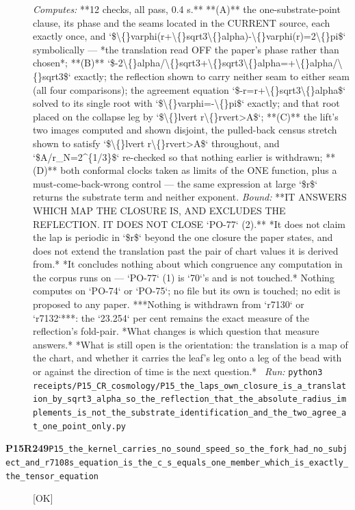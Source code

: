 \begin{description}
\emph{Computes:} **12 checks, all pass, 0.4 s.** **(A)** the one-substrate-point clause, its phase and the seams located in the CURRENT source, each exactly once, and `\$\textbackslash\{\}varphi(r+\textbackslash\{\}sqrt3\textbackslash\{\}alpha)-\textbackslash\{\}varphi(r)=2\textbackslash\{\}pi\$` symbolically --- *the translation read OFF the paper's phase rather than chosen*; **(B)** `\$-2\textbackslash\{\}alpha/\textbackslash\{\}sqrt3+\textbackslash\{\}sqrt3\textbackslash\{\}alpha=+\textbackslash\{\}alpha/\textbackslash\{\}sqrt3\$` exactly; the reflection shown to carry neither seam to either seam (all four comparisons); the agreement equation `\$-r=r+\textbackslash\{\}sqrt3\textbackslash\{\}alpha\$` solved to its single root with `\$\textbackslash\{\}varphi=-\textbackslash\{\}pi\$` exactly; and that root placed on the collapse leg by `\$\textbackslash\{\}lvert r\textbackslash\{\}rvert>A\$`; **(C)** the lift's two images computed and shown disjoint, the pulled-back census stretch shown to satisfy `\$\textbackslash\{\}lvert r\textbackslash\{\}rvert>A\$` throughout, and `\$A/r\_N=2\textasciicircum{}\{1/3\}\$` re-checked so that nothing earlier is withdrawn; **(D)** both conformal clocks taken as limits of the ONE function, plus a must-come-back-wrong control --- the same expression at large `\$r\$` returns the substrate term and neither exponent.
 \emph{Bound:}  **IT ANSWERS WHICH MAP THE CLOSURE IS, AND EXCLUDES THE REFLECTION. IT DOES NOT CLOSE `PO-77` (2).**  *It does not claim the lap is periodic in `\$r\$` beyond the one closure the paper states, and does not extend the translation past the pair of chart values it is derived from.*  *It concludes nothing about which congruence any computation in the corpus runs on --- `PO-77` (1) is `70`'s and is not touched.*  Nothing computes on `PO-74` or `PO-75`; no file but its own is touched; no edit is proposed to any paper.  ***Nothing is withdrawn from `r7130` or `r7132`***: the `23.254` per cent remains the exact measure of the reflection's fold-pair. *What changes is which question that measure answers.*  *What is still open is the orientation: the translation is a map of the chart, and whether it carries the leaf's leg onto a leg of the bead with or against the direction of time is the next question.*
\ \emph{Run:} \texttt{python3 receipts/P15\_CR\_cosmology/P15\_the\_laps\_own\_closure\_is\_a\_translation\_by\_sqrt3\_alpha\_so\_the\_reflection\_that\_the\_absolute\_radius\_implements\_is\_not\_the\_substrate\_identification\_and\_the\_two\_agree\_at\_one\_point\_only.py}
\item[\rcptlabel{P15_the_kernel_carries_no_sound_speed_so_the_fork_had_no_subject_and_r7108s_equation_is_the_c_s_equals_one_member_which_is_exactly_the_tensor_equation}{P15R249}\textbf{P15R249}\quad\texttt{P15\_the\_kernel\_carries\_no\_sound\_speed\_so\_the\_fork\_had\_no\_subject\_and\_r7108s\_equation\_is\_the\_c\_s\_equals\_one\_member\_which\_is\_exactly\_the\_tensor\_equation}]\hfill\textsf{[OK]}\\

\end{description}
